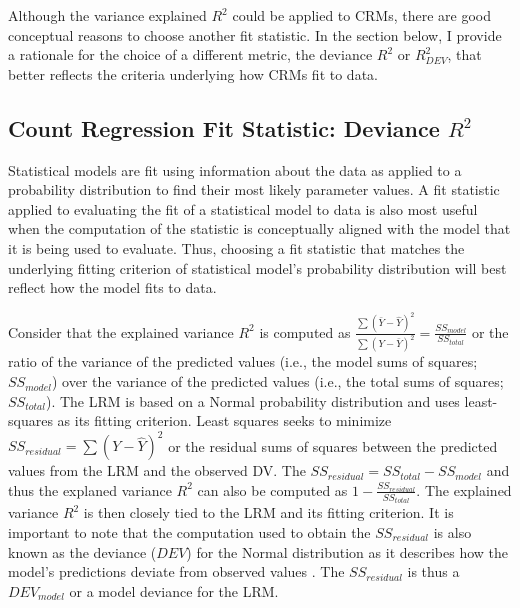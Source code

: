 \documentclass[man]{apa7}
\begin{document}
	Although the variance explained $R^2$ could be applied to CRMs, there are good conceptual reasons to choose another fit statistic. 
	In the section below, I provide a rationale for the choice of a different metric, the deviance $R^2$ or $R^2_{DEV}$, that better reflects the criteria underlying how CRMs fit to data. 
	
	\subsection{Count Regression Fit Statistic: Deviance $R^2$} 
	
	Statistical models are fit using information about the data as applied to a probability distribution to find their most likely parameter values.
	A fit statistic applied to evaluating the fit of a statistical model to data is also most useful when the computation of the statistic is conceptually aligned with the model that it is being used to evaluate.
	Thus, choosing a fit statistic that matches the underlying fitting criterion of statistical model's probability distribution will best reflect how the model fits to data.
	
	Consider that the explained variance $R^2$ is computed as $\frac{\sum (\bar{Y} - \hat{Y})^2}{\sum (Y - \bar{Y})^2} = \frac{SS_{model}}{SS_{total}}$ or the ratio of the variance of the predicted values (i.e., the model sums of squares; $SS_{model}$) over the variance of the predicted values (i.e., the total sums of squares; $SS_{total}$).
	The LRM is based on a Normal probability distribution and uses least-squares as its fitting criterion.
	Least squares seeks to minimize $SS_{residual} = \sum (Y - \hat{Y})^2$ or the residual sums of squares between the predicted values from the LRM and the observed DV. 
	The $SS_{residual} = SS_{total} - SS_{model}$ and thus the explaned variance $R^2$ can also be computed as $1 - \frac{SS_{residual}}{SS_{total}}$.
	The explained variance $R^2$ is then closely tied to the LRM and its fitting criterion.
	It is important to note that the computation used to obtain the $SS_{residual}$ is also known as the deviance ($DEV$) for the Normal distribution as it describes how the model's predictions deviate from observed values \parencite{mccullagh2019generalized}.
	The $SS_{residual}$ is thus a $DEV_{model}$ or a model deviance for the LRM.
	
\end{document}
